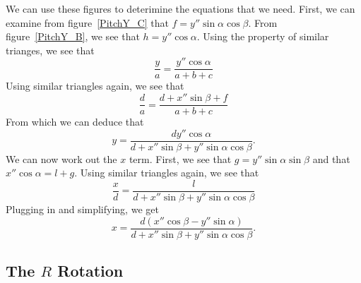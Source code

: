 \begin{SCfigure}[1][htb]
\centering
 
\label{PitchY_A}
\caption{.}
\end{SCfigure}

\begin{SCfigure}[1][htb]
\centering
 
\label{PitchY_B}
\caption{.}
\end{SCfigure}

\begin{SCfigure}[1][htb]
\centering
 
\label{PitchY_C}
\caption{.}
\end{SCfigure}

We can use these figures to deterimine the equations 
that we need. First, we can examine from figure~\ref{PitchY_C} 
that $f=y''\sin\alpha\cos\beta$. From figure~\ref{PitchY_B},
we see that $h=y''\cos\alpha$. Using the property of similar
trianges, we see that
\begin{equation}
    \frac{y}{a} = \frac{y''\cos\alpha}{a+b+c}
\end{equation}
Using similar triangles again, we see that
\begin{equation}
    \frac{d}{a} = \frac{d+x''\sin\beta+f}{a+b+c}
\end{equation}
From which we can deduce that
\begin{equation}
    \boxed{y=\frac{dy''\cos\alpha}{
    d+x''\sin\beta+y''\sin\alpha\cos\beta}.}
\end{equation}
We can now work out the $x$ term. First, we see that
$g=y''\sin\alpha\sin\beta$ and that 
$x''\cos\alpha=l+g$. Using similar triangles again, 
we see that 
\begin{equation}
    \frac{x}{d} = \frac{l}{d+x''\sin\beta+
    y''\sin\alpha\cos\beta}
\end{equation}
Plugging in and simplifying, we get
\begin{equation}
    \boxed{x=\frac{d(x''\cos\beta-y''\sin\alpha)}{
    d+x''\sin\beta+y''\sin\alpha\cos\beta}.}
\end{equation}


\subsection{The $R$ Rotation}

\begin{SCfigure}[1][htb]
\centering

\caption{This figure shows how points on a detector rotated 
by angle $R$ relate to the unrotated points. Remember that
a rotation of the plane is equivalent to the rotation of the
coordinates on the plane (which is what I have drawn).}
\label{RotationFormula}
\end{SCfigure}

